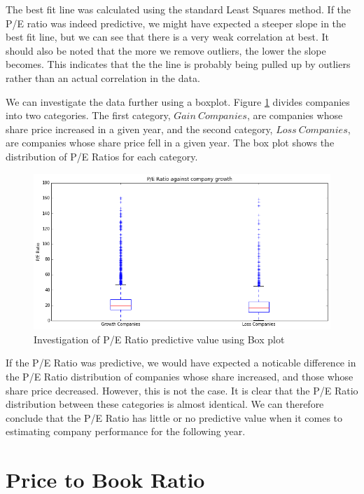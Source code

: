 \documentclass{report}
\begin{document}
The best fit line was calculated using the standard Least Squares method. If the P/E ratio was indeed predictive, we might have expected a steeper slope in the best fit line, but we can see that there is a very weak correlation at best. It should also be noted that the more we remove outliers, the lower the slope becomes. This indicates that the the line is probably being pulled up by outliers rather than an actual correlation in the data. 

We can investigate the data further using a boxplot. Figure \ref{fig:pe-box} divides companies into two categories. The first category, $Gain\ Companies$, are companies whose share price increased in a given year, and the second category, $Loss\ Companies$, are companies whose share price fell in a given year. The box plot shows the distribution of P/E Ratios for each category.

\begin{figure}[H]
	\caption{Investigation of P/E Ratio predictive value using Box plot}
	\centerline{\includegraphics[width=\textwidth]{vis/pe_box.png}}
	\label{fig:pe-box}
\end{figure}

If the P/E Ratio was predictive, we would have expected a noticable difference in the P/E Ratio distribution of companies whose share increased, and those whose share price decreased. However, this is not the case. It is clear that the P/E Ratio distribution between these categories is almost identical. We can therefore conclude that the P/E Ratio has little or no predictive value when it comes to estimating company performance for the following year.

\section{Price to Book Ratio}
\end{document}
